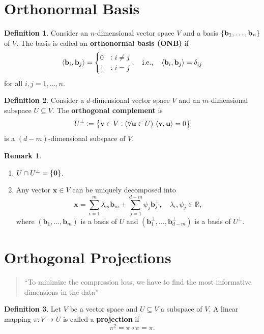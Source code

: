 \documentclass[12pt,openany]{book}
\theoremstyle{definition}
\newtheorem{definition}{Definition}[chapter]
\newtheorem{remark}{Remark}[chapter]
\newcommand{\R}{\mathbb{R}}
\newcommand{\ie}{\textnormal{i.e.}}
\newcommand{\inner}[1]{\langle #1\rangle}
\renewcommand{\vec}[1]{\textbf{#1}}
\begin{document}
	\section{Orthonormal Basis}
	\begin{tcolorbox}[colframe=defcolor,title={\color{white}\bf Orthnormal Bais}]
		\begin{definition}
			Consider an \(n\)-dimensional vector space \(V\) and a basis \(\set{\vec{b}_1,\dots,\vec{b}_n}\) of \(V\). The basis is called an \textbf{orthonormal basis (ONB)} if \[
			\inner{\vec{b}_i,\vec{b}_j}=\begin{cases}
				0 &:i\neq j\\
				1 &:i=j
			\end{cases},\quad\ie,\quad\inner{\vec{b}_i,\vec{b}_j}=\delta_{ij}
			\] for all \(i,j=1,\dots,n\).
		\end{definition}
	\end{tcolorbox}
	\vspace{8pt}
	\begin{tcolorbox}[colframe=defcolor,title={\color{white}\bf Orthogonal Complement}]
		\begin{definition}
			Consider a \(d\)-dimensional vector space \(V\) and an \(m\)-dimensional subspace \(U\subseteq V\). The \textbf{orthogonal complement} is \[
			U^\perp:=\set{\textbf{v}\in V:(\forall\vec{u}\in U)\ \inner{\textbf{v},\textbf{u}}=0}
			\]  is a \((d-m)\)-dimensional subspace of \(V\).
		\end{definition}
	\end{tcolorbox}
	\begin{remark}
		\ \begin{enumerate}[(1)]
			\item \(U\cap U^\perp=\set{\vec{0}}\).
			\item Any vector \(\textbf{x}\in V\) can be uniquely decomposed into \[
			\textbf{x}=\sum_{i=1}^m\lambda_m\vec{b}_m+\sum_{j=1}^{d-m}\psi_j\vec{b}_j^\perp,\quad\lambda_i,\psi_j\in\R,
			\] where \((\vec{b}_1,\dots,\vec{b}_m)\) is a basis of \(U\) and \((\vec{b}_1^\perp,\dots,\vec{b}_{d-m}^\perp)\) is a basis of \(U^\perp\).
		\end{enumerate}
	\end{remark}

	\section{Orthogonal Projections}
	\begin{quote}
		``To minimize the compression loss, we have to find the most informative dimensions in the data''
	\end{quote}
	\begin{tcolorbox}[colframe=defcolor,title={\color{white}\bf Projection}]
		\begin{definition}
		Let \(V\) be a vector space and $U\subseteq V$ a subspace of $V$. A linear mapping \(\pi:V\to U\) is called a \textbf{projection} if \[
		\pi^2=\pi\circ\pi=\pi.
		\]
		\end{definition}
	\end{tcolorbox}
\end{document}

